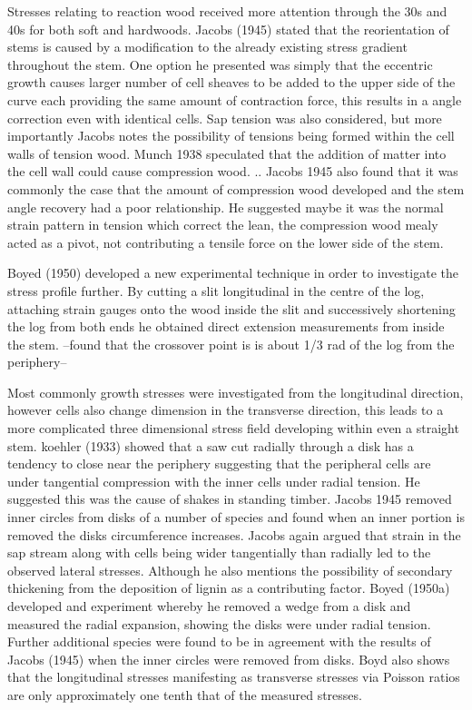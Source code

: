 \documentclass{article}
\begin{document}
Stresses relating to reaction wood received more attention through the 30s and
40s for both soft and hardwoods. Jacobs (1945) stated that the reorientation of
stems is caused by a modification to the already existing stress gradient
throughout the stem. One option he presented was simply that the eccentric
growth causes larger number of cell sheaves to be added to the upper side of the
curve each providing the same amount of contraction force, this results in a
angle correction even with identical cells. Sap tension was also considered, but
more importantly Jacobs notes the possibility of tensions being formed within the
cell walls of tension wood.
Munch 1938 speculated that the addition of matter into the cell wall could cause
compression wood. ..
Jacobs 1945 also found that it was commonly the case that the amount of
compression wood developed and the stem angle recovery had a poor relationship.
He suggested maybe it was the normal strain pattern in tension which
correct the lean, the compression wood mealy acted as a pivot, not contributing
a tensile force on the lower side of the stem.

Boyed (1950) developed a new experimental technique in order to investigate the
stress profile further. By cutting a slit longitudinal in the centre of the
log, attaching strain gauges onto the wood inside the slit and successively
shortening the log from both ends he obtained direct extension measurements from
inside the stem. --found that the crossover point is is about 1/3 rad of the log
from the periphery--

Most commonly growth stresses were investigated from the longitudinal direction,
however cells also change dimension in the transverse direction, this leads to a
more complicated three dimensional stress field developing within even a
straight stem.
koehler (1933) showed that a saw cut radially through a disk has a tendency to
close near the periphery suggesting that the peripheral cells are under
tangential compression with the inner cells under radial tension. He suggested this was the
cause of shakes in standing timber.
Jacobs 1945 removed inner circles from disks of a number of species and found
when an inner portion is removed the disks circumference increases. Jacobs again
argued that strain in the sap stream along with cells being wider tangentially
than radially led to the observed lateral stresses. Although he also mentions
the possibility of secondary thickening from the deposition of lignin as a
contributing factor.
Boyed (1950a) developed and experiment whereby he removed a wedge from a disk
and measured the radial expansion, showing the disks were under radial
tension. Further additional species were found to be in agreement with the
results of Jacobs (1945) when the inner circles were removed from disks. Boyd also shows
that the longitudinal stresses manifesting as transverse stresses via Poisson
ratios are only approximately one tenth that of the measured stresses.
\end{document}
